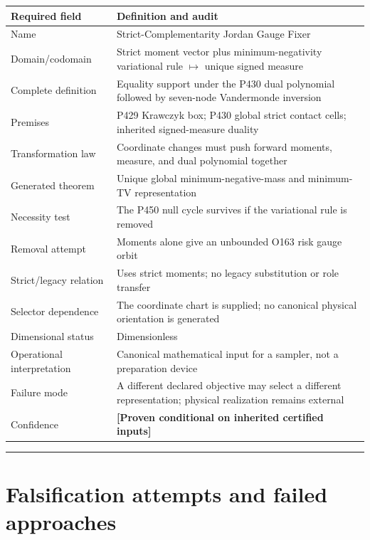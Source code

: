 \documentclass[11pt,a4paper,openany]{report}
\begin{document}
\begin{center}
\begingroup\small
\setlength{\tabcolsep}{2.5pt}
\renewcommand{\arraystretch}{1.16}
\begin{longtable}{@{}p{}p{}@{}}
\toprule
\textbf{Required field} & \textbf{Definition and audit} \\
\midrule
\endhead
Name & Strict-Complementarity Jordan Gauge Fixer \\
Domain/\allowbreak{}codomain & Strict moment vector plus minimum-negativity variational rule \(\mapsto\) unique signed measure \\
Complete definition & Equality support under the P430 dual polynomial followed by seven-node Vandermonde inversion \\
Premises & P429 Krawczyk box; P430 global strict contact cells; inherited signed-measure duality \\
Transformation law & Coordinate changes must push forward moments, measure, and dual polynomial together \\
Generated theorem & Unique global minimum-negative-mass and minimum-TV representation \\
Necessity test & The P450 null cycle survives if the variational rule is removed \\
Removal attempt & Moments alone give an unbounded O163 risk gauge orbit \\
Strict/\allowbreak{}legacy relation & Uses strict moments; no legacy substitution or role transfer \\
Selector dependence & The coordinate chart is supplied; no canonical physical orientation is generated \\
Dimensional status & Dimensionless \\
Operational interpretation & Canonical mathematical input for a sampler, not a preparation device \\
Failure mode & A different declared objective may select a different representation; physical realization remains external \\
Confidence & \textbf{[Proven conditional on inherited certified inputs]} \\
\bottomrule
\end{longtable}
\endgroup
\end{center}

\par\medskip\hrule\medskip

\chapter{Falsification attempts and failed approaches}
\end{document}
